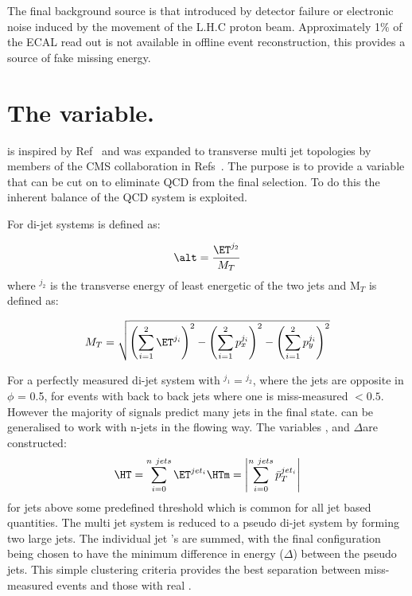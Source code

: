 The final background source is that introduced by detector failure or 
electronic noise induced by the movement of the L.H.C proton beam.
Approximately 1$\%$ of the ECAL read out is not available in offline event 
reconstruction, this provides a source of fake missing energy.

\section{The \alt variable.} %
\label{sec:the_alpha___t_variable_}
\alt is inspired by Ref~\cite{Randall:2008dk} and was expanded to transverse 
multi jet topologies by members of the CMS collaboration in 
Refs~\cite{cms-pas-sus-08005,cms-pas-sus-09001}. The purpose is to provide a 
variable that can be cut on to eliminate QCD from the final selection. To do 
this the inherent balance of the QCD system is exploited.

For di-jet systems \alt is defined as:

\begin{equation}
  \alt = \frac{\ET^{j_{2}}}{M_{T}}
\end{equation}
where \ET$^{j_{2}}$ is the transverse energy of least energetic of the two jets 
and M$_{T}$ is defined as:

\begin{equation}
  M_{T} = \sqrt{\left(\sum^{2}_{i=1}\ET^{j_{i}}\right)^2 - \left(\sum^{2}_{i=1}p_{x}^{j_{i}}\right)^{2} - \left(\sum^{2}_{i=1}p_{y}^{j_{i}}\right)^{2}}
\end{equation}

For a perfectly measured di-jet system with \ET$^{j_{1}} = $\ET$^{j_{2}}$, 
where the jets are opposite in $\phi$ \alt = 0.5, for events with back to back 
jets where one is miss-measured \alt $ < 0.5$.
However the majority of signals predict many jets in the final state.
\alt can be generalised to work with n-jets in the flowing way.
The variables \HT, \HTm and $\Delta$\HT are constructed:
\begin{equation}
  \HT = \sum_{i = 0}^{n~jets}\ET^{jet_{i}} \\
  \HTm = \left|\sum_{i = 0}^{n~jets}\bar{p}_{T}^{jet_{i}}\right|
\end{equation}
for jets above some predefined threshold \ET which is common for all jet based 
quantities. The multi jet system is reduced to a pseudo di-jet system by 
forming two large jets. The individual jet \ET's are summed, with the final 
configuration being chosen to have the minimum difference in energy 
($\Delta$\HT) between the pseudo jets. This simple clustering criteria provides 
the best separation between miss-measured events and those with real \MET.

